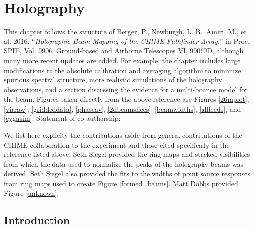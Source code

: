 \chapter{\label{chap:hol} Holography}
 



This chapter follows the structure of 
\newline
\newline
Berger, P., Newburgh, L. B., Amiri, M., et al. 2016, ``\textit{Holographic Beam Mapping of the CHIME Pathfinder Array},'' in Proc. SPIE, Vol. 9906, Ground-based and Airborne Telescopes VI, 99060D,
\newline
\newline
although many more recent updates are added. For example, the chapter includes large modifications to the absolute calibration and averaging algorithm to minimize spurious spectral structure, more realistic simulations of the holography observations, and a section discussing the evidence for a multi-bounce model for the beam.
\newline
\newline
\noindent Figures taken directly from the above reference are Figures \ref{26mplot}, \ref{virraw}, \ref{griddeddata}, \ref{phaseav}, \ref{2dbeamslices}, \ref{beamwidths}, \ref{allfeeds}, and \ref{cygasim}.
\newline
\newline
\noindent Statement of co-authorship:

\noindent We list here explicity the contributions aside from general contributions of the CHIME collaboration to the experiment and those cited specifically in the reference listed above. Seth Siegel provided the ring maps and stacked visibilities from which the data used to normalize the peaks of the holography beams was derived. Seth Siegel also provided the fits to the widths of point source responses from ring maps used to create Figure \ref{formed_beams}. Matt Dobbs provided Figure \ref{unknown}.


\newpage

\section{Introduction} \label{ch:hol:sec:intro}

